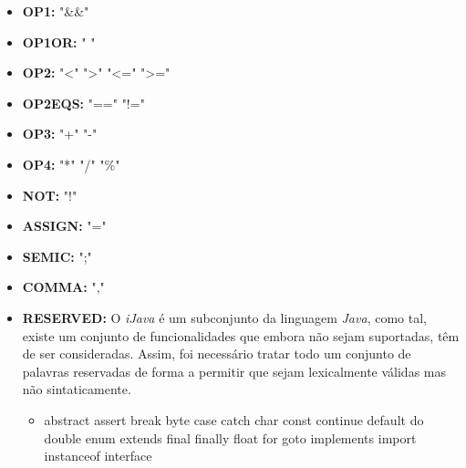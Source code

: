 \documentclass[12pt]{article}
\begin{document}
		\begin{itemize}  
	        \item \textbf{OP1:} "\&\&"  
	        \item \textbf{OP1OR:} "\text{\textbar} \text{\textbar}"
	        \item \textbf{OP2:} "\textless" \text{\textbar} "\textgreater" \text{\textbar} "\textless=" \text{\textbar} "\textgreater="
	        \item \textbf{OP2EQS:} "==" \text{\textbar} "!="	        
	        \item \textbf{OP3:} "+" \text{\textbar} "-"
	        \item \textbf{OP4:} "*" \text{\textbar} "/" \text{\textbar} "\%"
	        \item \textbf{NOT:} "!"
	        \item \textbf{ASSIGN:} "="
	        \item \textbf{SEMIC:} ";"
	        \item \textbf{COMMA:} ","
	        \item \textbf{RESERVED:} O \emph{iJava} é um subconjunto da linguagem \emph{Java}, como tal, existe um conjunto de funcionalidades que embora não sejam suportadas, têm de ser consideradas. Assim, foi necessário tratar todo um conjunto de palavras reservadas de forma a permitir que sejam lexicalmente válidas mas não sintaticamente. 
	       	            \begin{itemize}
	       	                \item abstract
	       	                \text{\textbar} assert 
	       	                \text{\textbar} break 
	       	                \text{\textbar} byte 
	       	                \text{\textbar} case 
	       	                \text{\textbar} catch 
	       	                \text{\textbar} char 
	       	                \text{\textbar} const 
	       	                \text{\textbar} continue
	       	                 \text{\textbar} default 
	       	                 \text{\textbar} do 
	       	                 \text{\textbar} double
	       	                 \text{\textbar} enum 
	       	                 \text{\textbar} extends 
	       	                 \text{\textbar} final 
	       	                 \text{\textbar} finally 
	       	                 \text{\textbar} float 
	       	                 \text{\textbar} for 
	       	                 \text{\textbar} goto 
	       	                 \text{\textbar} implements 
	       	                 \text{\textbar} import 
	       	                 \text{\textbar} instanceof
	       	                 \text{\textbar} interface 

\end{itemize}
\end{itemize}
\end{document}
